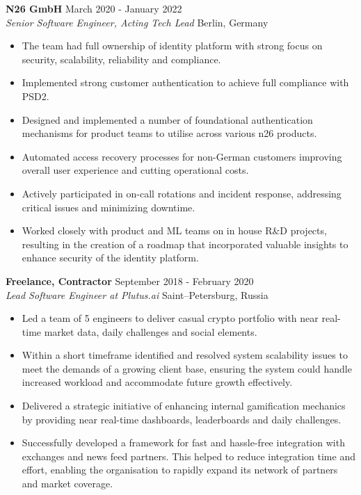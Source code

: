 \documentclass[a4paper]{article}
\newcommand{\employer} [4] {
    \textbf{#1} \hfill {#3} \\
    \textit{#2} \hfill {#4} \\
    \vspace{0mm}
}
\begin{document}
    \employer{N26 GmbH}{Senior Software Engineer, Acting Tech Lead}{March 2020 - January 2022}{Berlin, Germany}
    \begin{itemize}[itemsep=-1mm]
        \item The team had full ownership of identity platform with strong focus on security, scalability, reliability and compliance.
        \item Implemented strong customer authentication to achieve full compliance with PSD2.
        \item Designed and implemented a number of foundational authentication mechanisms for product teams to utilise across various n26 products.
        \item Automated access recovery processes for non-German customers improving overall user experience and cutting operational costs.
        \item Actively participated in on-call rotations and incident response, addressing critical issues and minimizing downtime.
        \item Worked closely with product and ML teams on in house R\&D projects, resulting in the creation of a roadmap that
        incorporated valuable insights to enhance security of the identity platform.
    \end{itemize}

    \employer{Freelance, Contractor}{Lead Software Engineer at Plutus.ai}{September 2018 - February 2020}{Saint–Petersburg, Russia}
    \begin{itemize}[itemsep=-1mm]
        \item Led a team of 5 engineers to deliver casual crypto portfolio with near real-time market data, daily challenges and social elements.
        \item Within a short timeframe identified and resolved system scalability issues to meet the demands of a growing client base,
        ensuring the system could handle increased workload and accommodate future growth effectively.
        \item Delivered a strategic initiative of enhancing internal gamification mechanics by providing near real-time dashboards, leaderboards
        and daily challenges.
        \item Successfully developed a framework for fast and hassle-free integration with exchanges and news feed partners.
        This helped to reduce integration time and effort, enabling the organisation to rapidly expand its network of partners and market coverage.
    \end{itemize}
\end{document}
